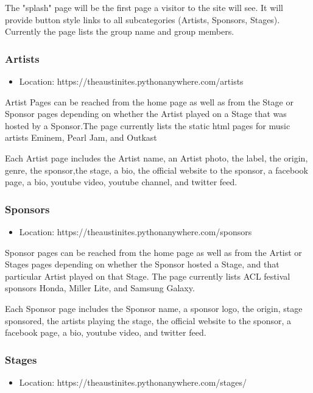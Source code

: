 \documentclass[12pt,english]{scrartcl}
\begin{document}
The "splash" page will be the first page a visitor to the site will see. It will provide button style links to all subcategories (Artists,
Sponsors, Stages). Currently the page lists the group name and group members.

\subsubsection{Artists}
\begin{itemize}
 \item Location: https://theaustinites.pythonanywhere.com/artists
\end{itemize}

Artist Pages can be reached from the home page as well as from the Stage or Sponsor pages depending on whether the Artist played on
a Stage that was hosted by a Sponsor.The page currently lists the static html pages for music artists Eminem, Pearl Jam, and Outkast

Each Artist page includes the Artist name, an Artist photo, the label, the origin, genre, the sponsor,the stage, a bio,
the official website to the sponsor, a facebook page, a bio, youtube video, youtube channel, and twitter feed.

\subsubsection{Sponsors}
\begin{itemize}
 \item Location: https://theaustinites.pythonanywhere.com/sponsors
\end{itemize}

Sponsor pages can be reached from the home page as well as from the Artist or Stages pages depending on whether the Sponsor hosted a
Stage, and that particular Artist played on that Stage. The page currently lists ACL festival sponsors Honda, Miller Lite, and Samsung Galaxy.

Each Sponsor page includes the Sponsor name, a sponsor logo, the origin, stage sponsored, the artists playing the stage, the official website to the sponsor,
a facebook page, a bio, youtube video, and twitter feed.

\subsubsection{Stages}
\begin{itemize}
 \item Location: https://theaustinites.pythonanywhere.com/stages/
\end{itemize}
\end{document}
